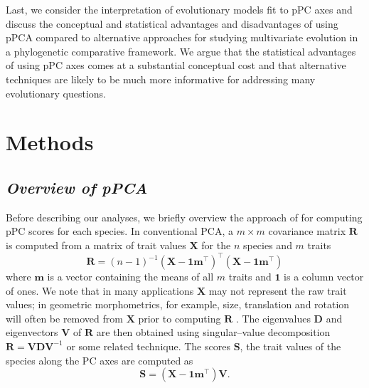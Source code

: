 \documentclass[a4paper,12pt]{article}
\begin{document}
Last, we consider the interpretation of evolutionary models fit to pPC axes and discuss the conceptual and statistical advantages and disadvantages of using pPCA compared to alternative approaches for studying multivariate evolution in a phylogenetic comparative framework. We argue that the statistical advantages of using pPC axes comes at a substantial conceptual cost and that alternative techniques are likely to be much more informative for addressing many evolutionary questions.

\section{Methods}
\subsection{\emph{Overview of pPCA}}
Before describing our analyses, we briefly overview the approach of \citet{Revell2008} for computing pPC scores for each species. In conventional PCA, a $m \times m$ covariance matrix $\mathbf{R}$ is computed from a matrix of trait values $\mathbf{X}$ for the $n$ species and $m$ traits
\begin{equation}\label{eq:rpca}
\mathbf{R} = (n-1)^{-1}(\mathbf{X} - \mathbf{1m}^\intercal)^\intercal (\mathbf{X} - \mathbf{1m}^\intercal)
\end{equation}
where $\mathbf{m}$ is a vector containing the means of all $m$ traits and $\mathbf{1}$ is a column vector of ones. We note that in many applications $\mathbf{X}$ may not represent the raw trait values; in geometric morphometrics, for example, size, translation and rotation will often be removed from $\mathbf{X}$ prior to computing $\mathbf{R}$ \citep{RohlfSlice, Bookstein1997}. The eigenvalues $\mathbf{D}$ and eigenvectors $\mathbf{V}$ of $\mathbf{R}$ are then obtained using singular--value decomposition $\mathbf{R}=\mathbf{V}\mathbf{D}\mathbf{V}^{-1}$ or some related technique. The scores $\mathbf{S}$, the trait values of the species along the PC axes are computed as
\begin{equation}\label{eq:Spca}
\mathbf{S}=(\mathbf{X} - \mathbf{1m}^\intercal)\mathbf{V}.
\end{equation}
\end{document}
